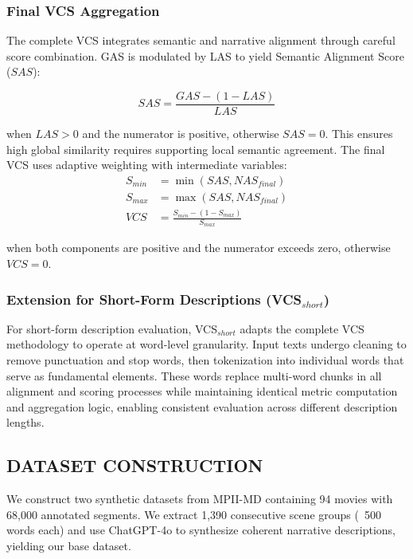 \documentclass[main.tex]{subfiles}
\begin{document}
\subsubsection{Final VCS Aggregation}
The complete VCS integrates semantic and narrative alignment through careful score combination. GAS is modulated by LAS to yield Semantic Alignment Score ($SAS$):

\begin{equation} \label{eq:sas_revised} 
SAS = \frac{GAS - (1 - LAS)}{LAS}
\end{equation}

when $LAS > 0$ and the numerator is positive, otherwise $SAS = 0$. This ensures high global similarity requires supporting local semantic agreement. The final VCS uses adaptive weighting with intermediate variables:
\begin{align}
S_{min} &= \min(SAS, NAS_{final}) \label{eq:s_min} \\
S_{max} &= \max(SAS, NAS_{final}) \label{eq:s_max} \\
VCS &= \frac{S_{min} - (1 - S_{max})}{S_{max}} \label{eq:vcs_final}
\end{align}

when both components are positive and the numerator exceeds zero, otherwise $VCS = 0$.

\subsubsection{Extension for Short-Form Descriptions (VCS$_{short}$)}
For short-form description evaluation, VCS$_{short}$ adapts the complete VCS methodology to operate at word-level granularity. Input texts undergo cleaning to remove punctuation and stop words, then tokenization into individual words that serve as fundamental elements. These words replace multi-word chunks in all alignment and scoring processes while maintaining identical metric computation and aggregation logic, enabling consistent evaluation across different description lengths.

\subsection{DATASET CONSTRUCTION}

We construct two synthetic datasets from MPII-MD containing 94 movies with 68,000 annotated segments. We extract 1,390 consecutive scene groups (~500 words each) and use ChatGPT-4o to synthesize coherent narrative descriptions, yielding our base dataset.
\end{document}
